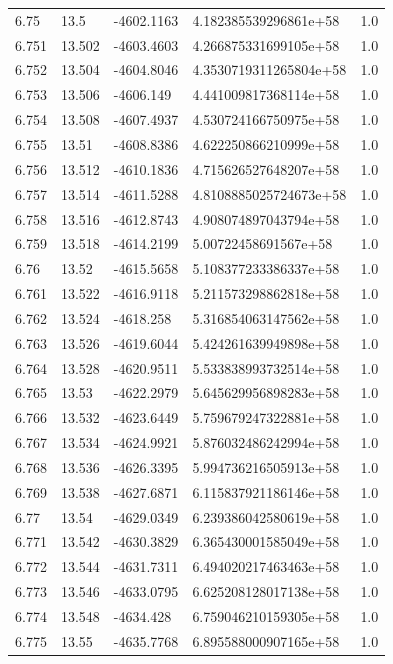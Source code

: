 \begin{tabular}{lllll}
6.75 & 13.5 & -4602.1163 & 4.182385539296861e+58 & 1.0 \\
6.751 & 13.502 & -4603.4603 & 4.266875331699105e+58 & 1.0 \\
6.752 & 13.504 & -4604.8046 & 4.3530719311265804e+58 & 1.0 \\
6.753 & 13.506 & -4606.149 & 4.441009817368114e+58 & 1.0 \\
6.754 & 13.508 & -4607.4937 & 4.530724166750975e+58 & 1.0 \\
6.755 & 13.51 & -4608.8386 & 4.622250866210999e+58 & 1.0 \\
6.756 & 13.512 & -4610.1836 & 4.715626527648207e+58 & 1.0 \\
6.757 & 13.514 & -4611.5288 & 4.8108885025724673e+58 & 1.0 \\
6.758 & 13.516 & -4612.8743 & 4.908074897043794e+58 & 1.0 \\
6.759 & 13.518 & -4614.2199 & 5.00722458691567e+58 & 1.0 \\
6.76 & 13.52 & -4615.5658 & 5.108377233386337e+58 & 1.0 \\
6.761 & 13.522 & -4616.9118 & 5.211573298862818e+58 & 1.0 \\
6.762 & 13.524 & -4618.258 & 5.316854063147562e+58 & 1.0 \\
6.763 & 13.526 & -4619.6044 & 5.424261639949898e+58 & 1.0 \\
6.764 & 13.528 & -4620.9511 & 5.533838993732514e+58 & 1.0 \\
6.765 & 13.53 & -4622.2979 & 5.645629956898283e+58 & 1.0 \\
6.766 & 13.532 & -4623.6449 & 5.759679247322881e+58 & 1.0 \\
6.767 & 13.534 & -4624.9921 & 5.876032486242994e+58 & 1.0 \\
6.768 & 13.536 & -4626.3395 & 5.994736216505913e+58 & 1.0 \\
6.769 & 13.538 & -4627.6871 & 6.115837921186146e+58 & 1.0 \\
6.77 & 13.54 & -4629.0349 & 6.239386042580619e+58 & 1.0 \\
6.771 & 13.542 & -4630.3829 & 6.365430001585049e+58 & 1.0 \\
6.772 & 13.544 & -4631.7311 & 6.494020217463463e+58 & 1.0 \\
6.773 & 13.546 & -4633.0795 & 6.625208128017138e+58 & 1.0 \\
6.774 & 13.548 & -4634.428 & 6.759046210159305e+58 & 1.0 \\
6.775 & 13.55 & -4635.7768 & 6.895588000907165e+58 & 1.0 \\

\end{tabular}
